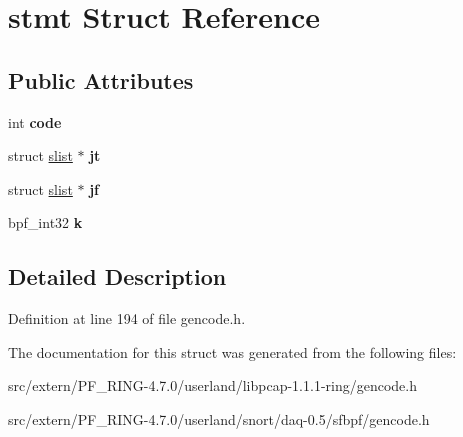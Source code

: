 \hypertarget{structstmt}{
\section{stmt Struct Reference}
\label{structstmt}
}
\subsection*{Public Attributes}
\begin{DoxyCompactItemize}
\item 
\hypertarget{structstmt_a668895332d8e0e5e3b8daa035c86f77e}{
int {\bfseries code}}
\label{structstmt_a668895332d8e0e5e3b8daa035c86f77e}

\item 
\hypertarget{structstmt_af39ebda4ff21b676fb6dc79d9918d7f5}{
struct \hyperlink{structslist}{slist} $\ast$ {\bfseries jt}}
\label{structstmt_af39ebda4ff21b676fb6dc79d9918d7f5}

\item 
\hypertarget{structstmt_a593613b2d20036294975d82452e5108b}{
struct \hyperlink{structslist}{slist} $\ast$ {\bfseries jf}}
\label{structstmt_a593613b2d20036294975d82452e5108b}

\item 
\hypertarget{structstmt_aaa8c10d28caa75a61a5d604b43d15da5}{
bpf\_\-int32 {\bfseries k}}
\label{structstmt_aaa8c10d28caa75a61a5d604b43d15da5}

\end{DoxyCompactItemize}


\subsection{Detailed Description}


Definition at line 194 of file gencode.h.



The documentation for this struct was generated from the following files:\begin{DoxyCompactItemize}
\item 
src/extern/PF\_\-RING-\/4.7.0/userland/libpcap-\/1.1.1-\/ring/gencode.h\item 
src/extern/PF\_\-RING-\/4.7.0/userland/snort/daq-\/0.5/sfbpf/gencode.h\end{DoxyCompactItemize}
